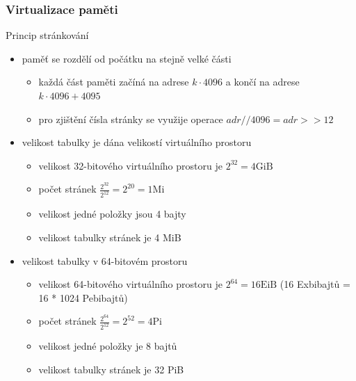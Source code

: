 \documentclass{beamer}
\begin{document}
\begin{frame}
\frametitle{Virtualizace paměti}

Princip stránkování
\begin{itemize}
\item paměť se rozdělí od počátku na stejně velké části
\begin{itemize}
\item každá část paměti začíná na adrese $k \cdot 4096$ a končí na adrese $k \cdot 4096 + 4095$
\item pro zjištění čísla stránky se využije operace $adr // 4096 = adr >> 12$
\end{itemize}
\item velikost tabulky je dána velikostí virtuálního prostoru
\begin{itemize}
\item velikost 32-bitového virtuálního prostoru je $2^{32} = 4\text{GiB}$
\item počet stránek $\frac{2^{32}}{2^{12}} = 2^{20} = 1\text{Mi}$
\item velikost jedné položky jsou 4 bajty
\item velikost tabulky stránek je 4 MiB
\end{itemize}
\item velikost tabulky v 64-bitovém prostoru
\begin{itemize}
\item velikost 64-bitového virtuálního prostoru je $2^{64} = 16\text{EiB}$ (16 Exbibajtů = 16 * 1024 Pebibajtů)
\item počet stránek $\frac{2^{64}}{2^{12}} = 2^{52} = 4\text{Pi}$
\item velikost jedné položky je 8 bajtů
\item velikost tabulky stránek je 32 PiB
\end{itemize}
\end{itemize}
\end{frame}
\end{document}
